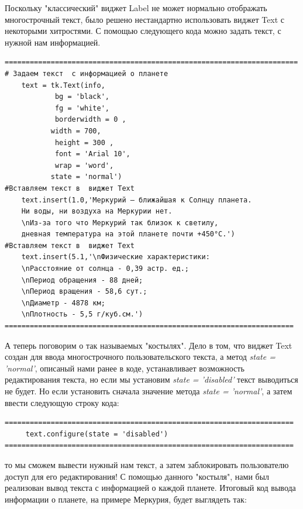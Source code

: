 \documentclass[11pt,a4paper]{report}
\begin{document}
Поскольку "классический" виджет Label не может нормально отображать многострочный текст, было решено нестандартно использовать виджет Text с некоторыми хитростями. 
С помощью следующего кода можно задать текст, с нужной нам информацией. 
\begin{verbatim}
======================================================================
# Задаем текст  с информацией о планете
    text = tk.Text(info,
            bg = 'black',
            fg = 'white',
            borderwidth = 0 ,
           width = 700, 
            height = 300 , 
            font = 'Arial 10', 
            wrap = 'word', 
           state = 'normal')
#Вставляем текст в  виджет Text    
    text.insert(1.0,'Меркурий — ближайшая к Солнцу планета. 
    Ни воды, ни воздуха на Меркурии нет. 
    \nИз-за того что Меркурий так близок к светилу,
    дневная температура на этой планете почти +450°С.')
#Вставляем текст в  виджет Text        
    text.insert(5.1,'\nФизические характеристики:
    \nРасстояние от солнца - 0,39 астр. ед.;
    \nПериод обращения - 88 дней;
    \nПериод вращения - 58,6 сут.;
    \nДиаметр - 4878 км;
    \nПлотность - 5,5 г/куб.см.')
=====================================================================
\end{verbatim}
 А теперь поговорим о так называемых "костылях". Дело в том, что виджет Text создан для ввода многострочного пользовательского текста, а метод \textit{state = 'normal'}, описаный нами ранее в коде, устанавливает возможность редактирования текста, но если мы установим \textit{state = 'disabled'} текст выводиться не будет. Но если установить сначала значение метода  \textit{state = 'normal'}, а затем ввести следующую строку кода:
 \begin{verbatim}
=====================================================================
     text.configure(state = 'disabled')
=====================================================================
 \end{verbatim}
то мы сможем вывести нужный нам текст, а затем заблокировать пользователю доступ для его редактирования!
С помощью данного "костыля", нами был реализован вывод текста с информацией о каждой планете.
Итоговый код вывода информации о планете, на примере Меркурия, будет выглядеть так:
\end{document}
